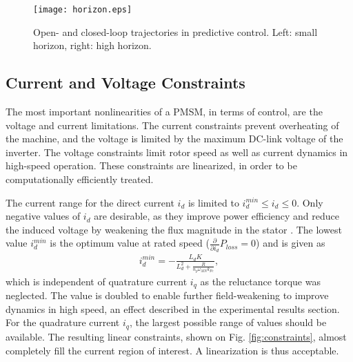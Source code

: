 \documentclass[a4paper,11pt,fleqn]{article}
\begin{document}

\begin{figure}[!ht]
  \centering
  \texttt{[image: horizon.eps]}
  \caption{Open- and closed-loop trajectories in predictive control. Left: small horizon, right: high horizon.\label{fig:horizon}}
\end{figure}




\subsection*{Current and Voltage Constraints}

The most important nonlinearities of a PMSM, in terms of control, are the  voltage and current limitations. The current constraints prevent overheating of the machine, and the voltage is limited by the maximum DC-link voltage of the inverter. The voltage constraints limit rotor speed as well as current dynamics in high-speed operation. These constraints are linearized, in order to be computationally efficiently treated. 

The current range for the direct current $i_d$ is limited to $i_d^{min}\le i_d \le 0$. Only negative values of $i_d$ are desirable, as they improve power efficiency and reduce the induced voltage by weakening the flux magnitude in the stator \cite{inhFW} \cite{PMSMeff}. The lowest value $i_d^{min}$ is the optimum value at rated speed ($\frac{\partial}{\partial i_d} P_{loss}=0$) and is given as 
\begin{align}
i_d^{min} = -\frac{ L_dK }{ L_d^2 + \frac{ R }{n_p \omega_{MN} k_{Fe} } }         ,
\end{align}
which is independent of quatrature current $i_q$ as the reluctance torque was neglected. The value is doubled to enable further field-weakening to improve dynamics in high speed, an effect described in the experimental results section. For the quadrature current $i_q$, the largest possible range of values should be available. The resulting linear constraints, shown on Fig. \ref{fig:constraints}, almost completely fill the current region of interest. A linearization is thus acceptable.
\end{document}
